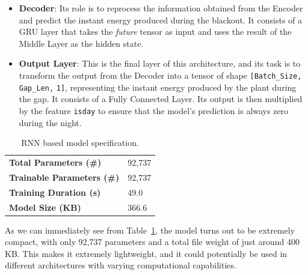 \begin{itemize}
	\item \textbf{Decoder}: Its role is to reprocess the information obtained from the Encoder and predict the instant energy produced during the blackout. It consists of a GRU layer that takes the \textit{future} tensor as input and uses the result of the Middle Layer as the hidden state.

	\item \textbf{Output Layer}: This is the final layer of this architecture, and its task is to transform the output from the Decoder into a tensor of shape \verb|[Batch_Size,| \verb|Gap_Len,| \verb|1]|, representing the instant energy produced by the plant during the gap. It consists of a Fully Connected Layer. Its output is then multiplied by the feature \verb|isday| to ensure that the model's prediction is always zero during the night.
\end{itemize}

\begin{table}[H]
	\begin{center}
		\begin{tabular}[c]{l|l}
			\textbf{Total Parameters (\#)}     & 92,737 \\
			\textbf{Trainable Parameters (\#)} & 92,737 \\
			\textbf{Training Duration (s)}     & 49.0   \\
			\textbf{Model Size (KB)}           & 366.6
		\end{tabular}
	\end{center}
	\caption{RNN based model specification.}\label{tab:grrunspecs}
\end{table}

As we can immediately see from Table~\ref{tab:grrunspecs}, the model turns out to be extremely compact, with only 92,737 parameters and a total file weight of just around 400 KB. This makes it extremely lightweight, and it could potentially be used in different architectures with varying computational capabilities.

